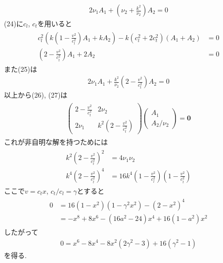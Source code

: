 \documentclass[uplatex,a4j,11pt,dvipdfmx]{jsarticle}
\begin{document}
\begin{align}
  2\nu_1A_1+\left(\nu_2+\frac{k^2}{\nu_2}\right)A_2=0
\end{align}
(24)に$c_l$, $c_t$を用いると
\begin{align}
  \begin{split}
    c_l^2\left(k\left(1-\frac{v^2}{c_l^2}\right)A_1+kA_2\right)-k(c_l^2+2c_t^2)(A_1+A_2)&=0\\
    (2-\frac{v^2}{c_t^2})A_1+2A_2&=0
  \end{split}
\end{align}
また(25)は
\begin{align}
  2\nu_1A_1+\frac{k^2}{\nu_2}\left(2-\frac{v^2}{c_t^2}\right)A_2=0
\end{align}
以上から(26), (27)は
\begin{align}
  \begin{split}
    \left(
      \begin{array}{cc}
        2-\frac{v^2}{c_t^2}&2\nu_2\\
        2\nu_1&k^2\left(2-\frac{v^2}{c_t^2}\right)
      \end{array}
    \right)\left(
      \begin{array}{c}
        A_1\\A_2/\nu_2
      \end{array}
    \right)={\bm 0}
  \end{split}
\end{align}
これが非自明な解を持つためには
\begin{align}
  \begin{split}
    k^2\left(2-\frac{v^2}{c_t^2}\right)^2&=4\nu_1\nu_2\\
    k^4\left(2-\frac{v^2}{c_t^2}\right)^4&=16k^4\left(1-\frac{v^2}{c_l^2}\right)\left(1-\frac{v^2}{c_t^2}\right)
  \end{split}
\end{align}
ここで$v=c_tx$, $c_t/c_l=\gamma$とすると
\begin{align}
  \begin{split}
    0&=16(1-x^2)(1-\gamma^2x^2)-(2-x^2)^4\\
    &=-x^8+8x^6-(16a^2-24)x^4+16(1-a^2)x^2
  \end{split}
\end{align}
したがって
\begin{align}
  0=x^6-8x^4-8x^2(2\gamma^2-3)+16(\gamma^2-1)
\end{align}
を得る.
\end{document}
